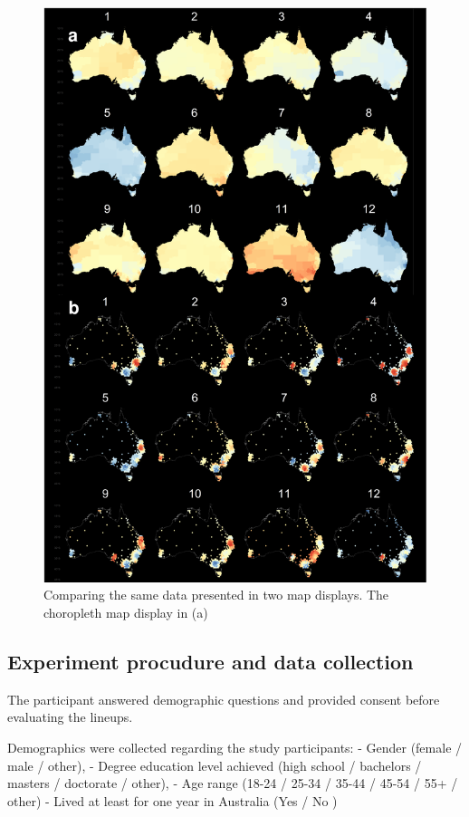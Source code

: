 \documentclass[conference,final,]{IEEEtran}
\makeatletter
\def\maxwidth{\ifdim\Gin@nat@width>\linewidth\linewidth
\else\Gin@nat@width\fi}
\let\Oldincludegraphics\includegraphics
\renewcommand{\includegraphics}[1]{\Oldincludegraphics[width=\maxwidth]{#1}}
\makeatother
\begin{document}
\begin{figure}
\centering
\includegraphics{paper_files/figure-latex/compare-1.pdf}
\caption{Comparing the same data presented in two map displays. The
choropleth map display in (a)}
\end{figure}

\hypertarget{experiment-procudure-and-data-collection}{%
\subsection{Experiment procudure and data
collection}\label{experiment-procudure-and-data-collection}}

The participant answered demographic questions and provided consent
before evaluating the lineups.

Demographics were collected regarding the study participants: - Gender
(female / male / other), - Degree education level achieved (high school
/ bachelors / masters / doctorate / other), - Age range (18-24 / 25-34 /
35-44 / 45-54 / 55+ / other) - Lived at least for one year in Australia
(Yes / No )
\end{document}
